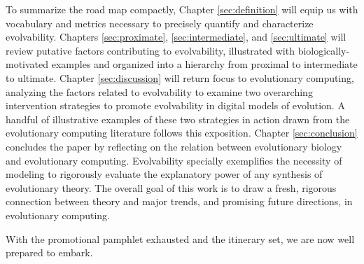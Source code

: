 To summarize the road map compactly, Chapter \ref{sec:definition} will equip us with vocabulary and metrics necessary to precisely quantify and characterize evolvability.
Chapters \ref{sec:proximate}, \ref{sec:intermediate}, and \ref{sec:ultimate} will review putative factors contributing to evolvability, illustrated with biologically-motivated examples and organized into a hierarchy from proximal to intermediate to ultimate.
Chapter \ref{sec:discussion} will return focus to evolutionary computing, analyzing the factors related to evolvability to examine two overarching intervention strategies to promote evolvability in digital models of evolution.
A handful of illustrative examples of these two strategies in action drawn from the evolutionary computing literature follows this exposition.
Chapter \ref{sec:conclusion} concludes the paper by reflecting on the relation between evolutionary biology and evolutionary computing.
Evolvability specially exemplifies the necessity of modeling to rigorously evaluate the explanatory power of any synthesis of evolutionary theory.
The overall goal of this work is to draw a fresh, rigorous connection between theory and major trends, and promising future directions, in evolutionary computing.

With the promotional pamphlet exhausted and the itinerary set, we are now well prepared to embark.

